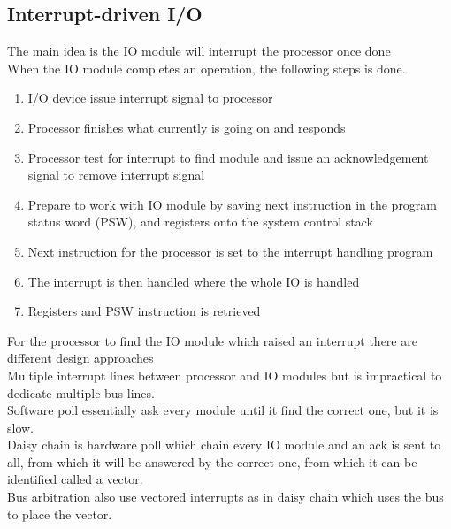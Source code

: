 \documentclass[12pt, a4paper]{article}
\begin{document}
		\subsection{Interrupt-driven I/O}
			The main idea is the IO module will interrupt the processor once done\\
			When the IO module completes an operation, the following steps is done.
			\begin{enumerate}
				\item I/O device issue interrupt signal to processor
				\item Processor finishes what currently is going on and responds
				\item Processor test for interrupt to find module and issue an acknowledgement signal to remove interrupt signal
				\item Prepare to work with IO module by saving next instruction in the program status word (PSW), and registers onto the system control stack
				\item Next instruction for the processor is set to the interrupt handling program
				\item The interrupt is then handled where the whole IO is handled
				\item Registers and PSW instruction is retrieved
			\end{enumerate}
			For the processor to find the IO module which raised an interrupt there are different design approaches\\
			Multiple interrupt lines between processor and IO modules but is impractical to dedicate multiple bus lines.\\
			Software poll essentially ask every module until it find the correct one, but it is slow.\\
			Daisy chain is hardware poll which chain every IO module and an ack is sent to all, from which it will be answered by the correct one, from which it can be identified called a vector.\\
			Bus arbitration also use vectored interrupts as in daisy chain which uses the bus to place the vector.\\
\end{document}
